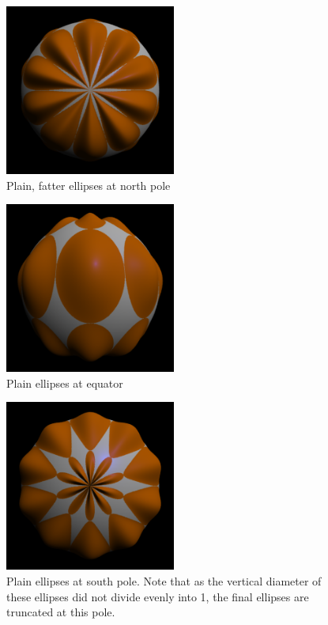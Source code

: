 \documentclass[12pt,letterpaper]{article}
\begin{document}
\begin{figure}[!h]
    \centering
    \includegraphics[width=0.5\textwidth]{img/p2_plain0.png}
    \caption{Plain, fatter ellipses at north pole}
\end{figure}

\begin{figure}[!h]
    \centering
    \includegraphics[width=0.5\textwidth]{img/p2_plain90.png}
    \caption{Plain ellipses at equator}
\end{figure}

\begin{figure}[!h]
    \centering
    \includegraphics[width=0.5\textwidth]{img/p2_plain180.png}
    \caption{Plain ellipses at south pole. Note that as the vertical diameter
        of these ellipses did not divide evenly into 1, the final ellipses are
        truncated at this pole.}
\end{figure}
\end{document}
